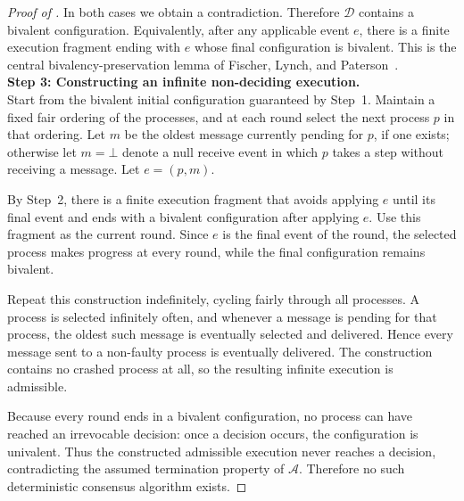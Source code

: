 \begin{proof}[Proof of ]
In both cases we obtain a contradiction. Therefore $\mathcal{D}$ contains a bivalent configuration. Equivalently, after any applicable event $e$, there is a finite execution fragment ending with $e$ whose final configuration is bivalent. This is the central bivalency-preservation lemma of Fischer, Lynch, and Paterson~\cite{flp1985}.
\\[20pt]
\textbf{Step 3: Constructing an infinite non-deciding execution.}
\\

Start from the bivalent initial configuration guaranteed by Step~1. Maintain a fixed fair ordering of the processes, and at each round select the next process $p$ in that ordering. Let $m$ be the oldest message currently pending for $p$, if one exists; otherwise let $m=\bot$ denote a null receive event in which $p$ takes a step without receiving a message. Let $e=(p,m)$.

By Step~2, there is a finite execution fragment that avoids applying $e$ until its final event and ends with a bivalent configuration after applying $e$. Use this fragment as the current round. Since $e$ is the final event of the round, the selected process makes progress at every round, while the final configuration remains bivalent.

Repeat this construction indefinitely, cycling fairly through all processes. A process is selected infinitely often, and whenever a message is pending for that process, the oldest such message is eventually selected and delivered. Hence every message sent to a non-faulty process is eventually delivered. The construction contains no crashed process at all, so the resulting infinite execution is admissible.

Because every round ends in a bivalent configuration, no process can have reached an irrevocable decision: once a decision occurs, the configuration is univalent. Thus the constructed admissible execution never reaches a decision, contradicting the assumed termination property of $\mathcal{A}$. Therefore no such deterministic consensus algorithm exists.
\end{proof}

